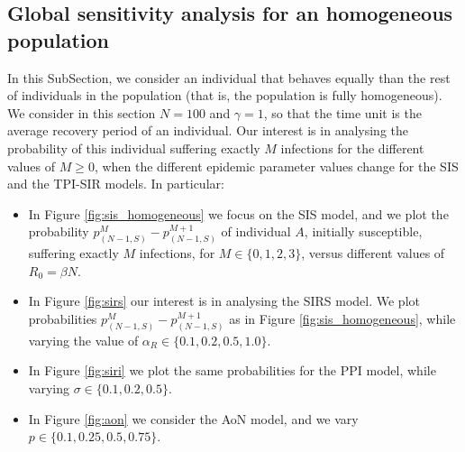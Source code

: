 \documentclass[preprint,12pt]{elsarticle}
\begin{document}
\subsection{Global sensitivity analysis for an homogeneous population}
\label{SubSect31}

\par In this SubSection, we consider an individual that behaves equally than the rest of individuals in the population (that is, the population is fully homogeneous). We consider in this section $N=100$ and $\gamma=1$, so that the time unit is the average recovery period of an individual. Our interest is in analysing the probability of this individual suffering exactly $M$ infections for the different values of $M\geq0$, when the different epidemic parameter values change for the SIS and the TPI-SIR models. In particular:

\begin{itemize}
    \item In Figure \ref{fig:sis_homogeneous} we focus on the SIS model, and we plot the probability $p_{(N-1,S)}^M-p_{(N-1,S)}^{M+1}$ of individual $A$, initially susceptible, suffering exactly $M$ infections, for $M\in\{0,1,2,3\}$, versus different values of $R_0=\beta N$.
    \item In Figure \ref{fig:sirs} our interest is in analysing the SIRS model. We plot probabilities $p_{(N-1,S)}^M-p_{(N-1,S)}^{M+1}$ as in Figure \ref{fig:sis_homogeneous}, while varying the value of $\alpha_R\in\{0.1,0.2,0.5,1.0\}$.
    \item In Figure \ref{fig:siri} we plot the same probabilities for the PPI model, while varying $\sigma\in\{0.1,0.2,0.5\}$.
    \item In Figure \ref{fig:aon} we consider the AoN model, and we vary $p\in\{0.1,0.25,0.5,0.75\}$.
\end{itemize}
\end{document}

